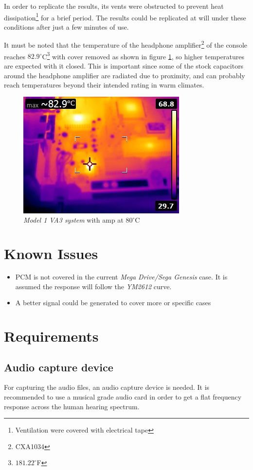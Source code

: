 \documentclass[10pt,a4paper]{report}
\begin{document}
\begin{appendices}
In order to replicate the results, its vents were obstructed to prevent heat dissipation\footnote{Ventilation were covered with electrical tape} for a brief period. The results could be replicated at will under these conditions after just a few minutes of use.

It must be noted that the temperature of the headphone amplifier\footnote{CXA1034} of the console reaches $82.9^\circ$C\footnote{$181.22^\circ$F} with cover removed as shown in figure \ref{fig:heathigh}, so higher temperatures are expected with it closed. This is important since some of the stock capacitors around the headphone amplifier are radiated due to proximity, and can probably reach temperatures beyond their intended rating in warm climates.

\begin{figure}[H]
	\centering
	\includegraphics[width=0.4\linewidth]{images/heat/2-hot.jpg}
	\caption[Hot Console]{\textit{Model 1 VA3 system} with amp at $80^\circ$C}
	\label{fig:heathigh}
\end{figure}

\chapter{Known Issues}

\begin{itemize}
	\item PCM is not covered in the current \textit{Mega Drive/Sega Genesis} case. It is assumed the response will follow the \textit{YM2612} curve.
	\item A better signal could be generated to cover more or specific cases
\end{itemize}

\chapter{Requirements}
\label{requirements}
\section{Audio capture device}
\label{audiocards}
For capturing the audio files, an audio capture device is needed. It is recommended to use a musical grade audio card in order to get a flat frequency response across the human hearing spectrum.


\end{appendices}
\end{document}
